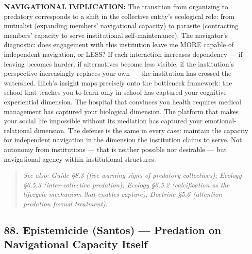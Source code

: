 \textbf{NAVIGATIONAL IMPLICATION:} The transition from organizing to predatory corresponds to a shift in the collective entity's ecological role: from mutualist (expanding members' navigational capacity) to parasite (contracting members' capacity to serve institutional self-maintenance). The navigator's diagnostic: does engagement with this institution leave me MORE capable of independent navigation, or LESS? If each interaction increases dependency — if leaving becomes harder, if alternatives become less visible, if the institution's perspective increasingly replaces your own — the institution has crossed the watershed. Illich's insight maps precisely onto the bottleneck framework: the school that teaches you to learn only in school has captured your cognitive-experiential dimension. The hospital that convinces you health requires medical management has captured your biological dimension. The platform that makes your social life impossible without its mediation has captured your emotional-relational dimension. The defense is the same in every case: maintain the capacity for independent navigation in the dimension the institution claims to serve. Not autonomy from institutions — that is neither possible nor desirable — but navigational agency within institutional structures.


\begin{quote}
\itshape
\textit{See also: Guide §8.3 (five warning signs of predatory collectives); Ecology §6.5.3 (inter-collective predation); Ecology §6.5.2 (calcification as the lifecycle mechanism that enables capture); Doctrine §5.6 (attention predation formal treatment).}
\end{quote}


\bigskip\noindent\makebox[\textwidth]{\color{rulegray}\rule{5cm}{0.3pt}}\bigskip


\subsection*{88. Epistemicide (Santos) — Predation on Navigational Capacity Itself}


